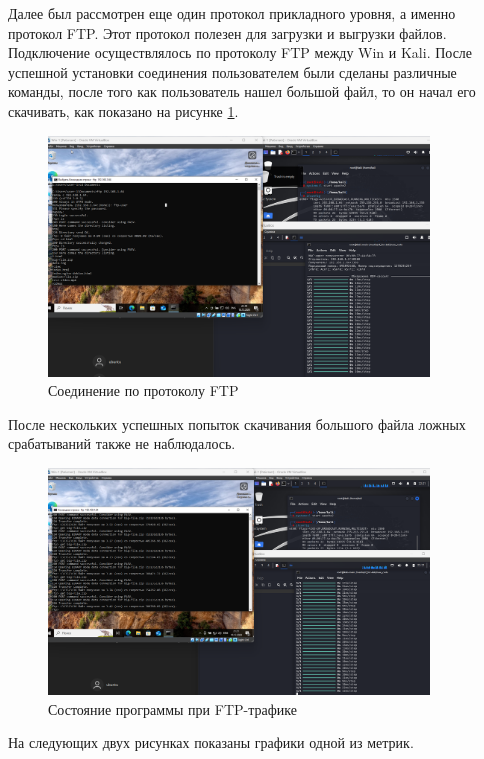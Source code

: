 \documentclass[bachelor, och, coursework]{SCWorks}
\begin{document}
Далее был рассмотрен еще один протокол прикладного уровня, а именно протокол FTP. Этот протокол полезен для загрузки и выгрузки файлов. Подключение осуществлялось 
по протоколу FTP между Win и Kali. После успешной установки соединения пользователем были сделаны различные команды, 
после того как пользователь нашел большой файл, то
он начал его скачивать, как показано на рисунке \ref{ftp1}.

\begin{figure}[H]
  \centering
  \includegraphics[width=0.9\textwidth]{pics/new3.png}
  \caption{Соединение по протоколу FTP}
  \label{ftp1}
\end{figure}

После нескольких успешных попыток скачивания большого файла ложных срабатываний также не наблюдалось.


\begin{figure}[H]
  \centering
  \includegraphics[width=0.9\textwidth]{pics/new4.png}
  \caption{Состояние программы при FTP-трафике}
  \label{ftp2}
\end{figure}

На следующих двух рисунках показаны графики одной из метрик. 
\end{document}
